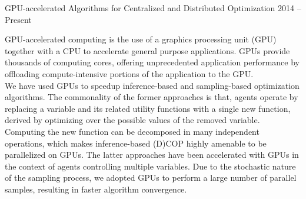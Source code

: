 \vspace{-20pt}
\begin{rSubsection}{GPU-accelerated Algorithms for Centralized and Distributed Optimization
}{2014 -- Present}{}{}
\item[]
\begin{figwindownonum}
%
GPU-accelerated computing is the use of a graphics processing unit (GPU) together with a CPU to accelerate general purpose applications. GPUs provide thousands of computing cores, %
offering unprecedented application performance by offloading compute-intensive portions of the application to the GPU. \\
We have used GPUs to speedup inference-based and sampling-based optimization algorithms. The commonality of the former approaches is that, agents operate by replacing a variable and its related utility functions with a single new function, derived by optimizing over the possible values of the removed variable. Computing the new function can be decomposed in many independent operations, which makes inference-based (D)COP highly amenable to be parallelized on GPUs. 
The latter approaches have been accelerated with GPUs in the context of agents controlling multiple variables. Due to the stochastic nature of the sampling process, we adopted GPUs to perform a large number of parallel samples, resulting in faster algorithm convergence.
%
\end{figwindownonum}
\end{rSubsection}

